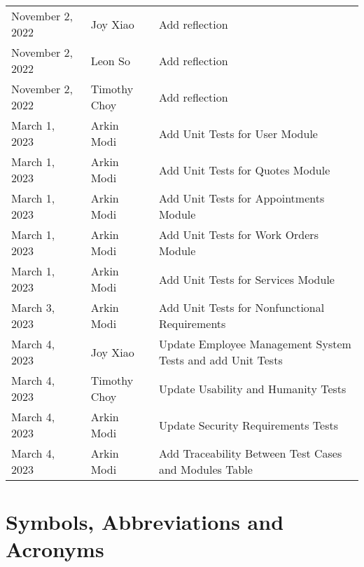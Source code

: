 \documentclass[12pt, titlepage]{article}
\begin{document}
\begin{longtable}{p{} p{} p{}}
	November 2, 2022 & Joy Xiao              & Add reflection                                             \\
	November 2, 2022 & Leon So               & Add reflection                                             \\
	November 2, 2022 & Timothy Choy          & Add reflection                                             \\
	March 1, 2023    & Arkin Modi            & Add Unit Tests for User Module                             \\
	March 1, 2023    & Arkin Modi            & Add Unit Tests for Quotes Module                           \\
	March 1, 2023    & Arkin Modi            & Add Unit Tests for Appointments Module                     \\
	March 1, 2023    & Arkin Modi            & Add Unit Tests for Work Orders Module                      \\
	March 1, 2023    & Arkin Modi            & Add Unit Tests for Services Module                         \\
	March 3, 2023    & Arkin Modi            & Add Unit Tests for Nonfunctional Requirements              \\
	March 4, 2023    & Joy Xiao              & Update Employee Management System Tests and add Unit Tests \\
	March 4, 2023    & Timothy Choy          & Update Usability and Humanity Tests                        \\
	March 4, 2023    & Arkin Modi            & Update Security Requirements Tests                         \\
	March 4, 2023    & Arkin Modi            & Add Traceability Between Test Cases and Modules Table \\
	\bottomrule
\end{longtable}

\newpage

\tableofcontents

\listoftables

\listoffigures

\newpage

\section{Symbols, Abbreviations and Acronyms}
\end{document}
